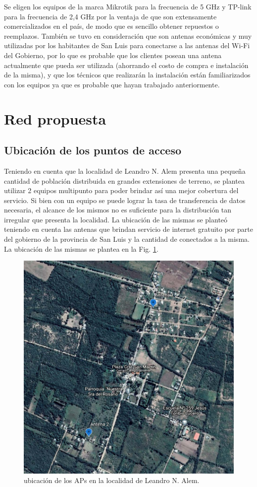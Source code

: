 \documentclass[11pt,a4paper]{article}
\begin{document}
Se eligen los equipos de la marca Mikrotik para la frecuencia de 5 GHz y TP-link para la frecuencia de 2,4 GHz por la ventaja de que son extensamente comercializados en el país, de modo que es sencillo obtener repuestos o reemplazos.
También se tuvo en consideración que son antenas económicas y muy utilizadas por los habitantes de San Luis para conectarse a las antenas del Wi-Fi del Gobierno, por lo que es probable que los clientes posean una antena actualmente que pueda ser utilizada (ahorrando el costo de compra e instalación de la misma), y que los técnicos que realizarán la instalación están familiarizados con los equipos ya que es probable que hayan trabajado anteriormente.



\section{Red propuesta}

\subsection{Ubicación de los puntos de acceso}
Teniendo en cuenta que la localidad de Leandro N. Alem presenta una pequeña cantidad de población distribuida en grandes extensiones de terreno, se plantea utilizar 2 equipos multipunto para poder brindar así una mejor cobertura del servicio. 
Si bien con un equipo se puede lograr la tasa de transferencia de datos necesaria, el alcance de los mismos no es suficiente para la distribución tan irregular que presenta la localidad. 
La ubicación de las mismas se planteó teniendo en cuenta las antenas que brindan servicio de internet gratuito por parte del gobierno de la provincia de San Luis y la cantidad de conectados a la misma. 
La ubicación de las mismas se plantea en la Fig. \ref{fig:ubic_ap_alem}.



\begin{figure}[ht!]
  \centering
  \includegraphics[width=0.7\linewidth]{fotos_ema/ubic_ap_alem.jpg}
  \caption{ubicación de los APs en la localidad de Leandro N. Alem.}
  \label{fig:ubic_ap_alem}
\end{figure}
\end{document}
